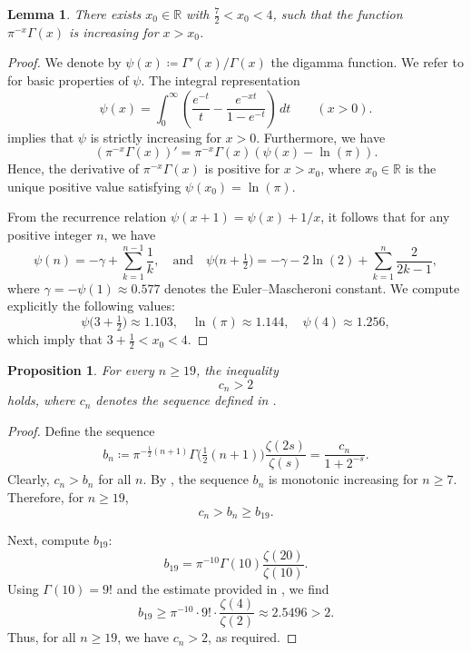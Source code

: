 \documentclass[a4paper]{amsart}
\theoremstyle{definition}
\theoremstyle{plain}
\newtheorem{lemma}[definition]{Lemma}
\newtheorem{proposition}[definition]{Proposition}
\newcommand{\IR}{\mathbb{R}}
\begin{document}
\begin{lemma} \label{lem:estimate.Gamma}
    There exists \(x_0 \in \IR\) with \(\frac 72 < x_0 < 4\), such that the function~\(\pi^{-x}\Gamma(x)\) is increasing for \(x > x_0\).
\end{lemma}
\begin{proof}
    We denote by \(\psi(x) \coloneqq \Gamma'(x)/\Gamma(x)\) the digamma function. We refer to \cite[§12.3]{Whittaker.Watson:course.modern.analysis} for basic properties of \(\psi\). The integral representation
    \[
        \psi(x) = \int _{0}^{\infty }\left({\frac {e^{-t}}{t}}-{\frac {e^{-xt}}{1-e^{-t}}}\right)\,dt \qquad (x>0).
    \]
    implies that \(\psi\) is strictly increasing for \(x > 0\).
    Furthermore, we have
    \[
        (\pi^{-x}\Gamma(x))' = \pi^{-x}\Gamma(x) (\psi(x) - \ln(\pi)).
    \]
    Hence, the derivative of \(\pi^{-x}\Gamma(x)\) is positive for \(x > x_0\), where \(x_0 \in \IR\) is the unique positive value satisfying \(\psi(x_0) = \ln(\pi)\). 
    
    From the recurrence relation \(\psi(x+1) = \psi(x) + 1/x\), it follows that for any positive integer \(n\), we have
    \[
        \psi(n) = -\gamma + \sum_{k = 1}^{n-1} \frac 1 k, \quad \text{and} \quad \psi\big( n + \tfrac 12 \big) = -\gamma - 2\ln(2) + \sum_{k = 1}^n \frac{2}{2k-1},
    \]
    where \(\gamma = -\psi(1) \approx 0.577\) denotes the Euler--Mascheroni constant. We compute explicitly the following values:
    \[
        \psi\big(3 + \tfrac 12\big) \approx 1.103, \quad \ln(\pi) \approx 1.144, \quad \psi(4) \approx 1.256,
    \]
    which imply that \(3 + \frac 12 < x_0 < 4\).
\end{proof}

\begin{proposition} \label{prop:c_n>2}
    For every \(n \geq 19\), the inequality 
    \[
        c_n > 2
    \]
    holds, where \(c_n\) denotes the sequence defined in .
\end{proposition}

\begin{proof}
Define the sequence 
\[
    b_n \coloneqq \pi^{-\frac{1}{2}(n+1)} \Gamma\big(\tfrac{1}{2}(n+1)\big) \frac{\zeta(2s)}{\zeta(s)} = \frac{c_n}{1 + 2^{-s}}.
\]
Clearly, \(c_n > b_n\) for all \(n\). By , the sequence \(b_n\) is monotonic increasing for \(n \geq 7\). Therefore, for \(n \geq 19\),
\[
    c_n > b_n \geq b_{19}.
\]

Next, compute \(b_{19}\):
\[
    b_{19} = \pi^{-10} \Gamma(10) \frac{\zeta(20)}{\zeta(10)}.
\]
Using \(\Gamma(10) = 9!\) and the estimate provided in , we find
\[
    b_{19} \geq \pi^{-10} \cdot 9! \cdot \frac{\zeta(4)}{\zeta(2)} \approx 2.5496 > 2.
\]
Thus, for all \(n \geq 19\), we have \(c_n > 2\), as required. \qedhere
\end{proof}
\end{document}
